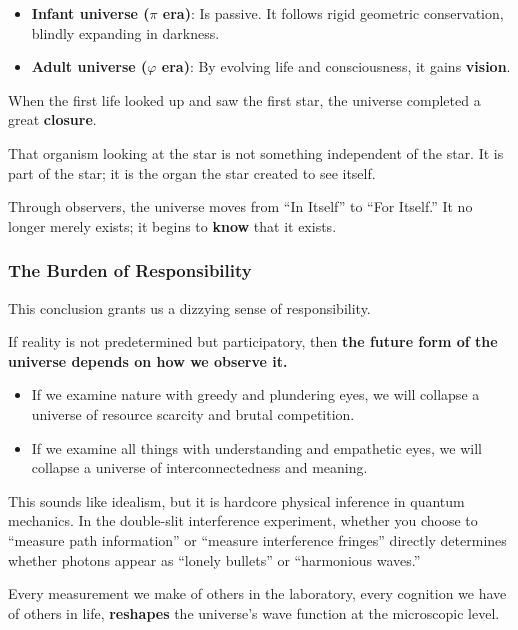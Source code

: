 \begin{itemize}
\item \textbf{Infant universe ($\pi$ era)}: Is passive. It follows rigid geometric conservation, blindly expanding in darkness.

\item \textbf{Adult universe ($\varphi$ era)}: By evolving life and consciousness, it gains \textbf{vision}.
\end{itemize}

When the first life looked up and saw the first star, the universe completed a great \textbf{closure}.

That organism looking at the star is not something independent of the star. It is part of the star; it is the organ the star created to see itself.

Through observers, the universe moves from ``In Itself'' to ``For Itself.'' It no longer merely exists; it begins to \textbf{know} that it exists.

\subsubsection{The Burden of Responsibility}

This conclusion grants us a dizzying sense of responsibility.

If reality is not predetermined but participatory, then \textbf{the future form of the universe depends on how we observe it.}

\begin{itemize}
\item If we examine nature with greedy and plundering eyes, we will collapse a universe of resource scarcity and brutal competition.

\item If we examine all things with understanding and empathetic eyes, we will collapse a universe of interconnectedness and meaning.
\end{itemize}

This sounds like idealism, but it is hardcore physical inference in quantum mechanics. In the double-slit interference experiment, whether you choose to ``measure path information'' or ``measure interference fringes'' directly determines whether photons appear as ``lonely bullets'' or ``harmonious waves.''

Every measurement we make of others in the laboratory, every cognition we have of others in life, \textbf{reshapes} the universe's wave function at the microscopic level.

